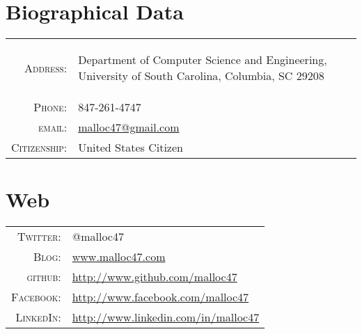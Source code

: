 \documentclass[a4paper,10pt]{article}
\begin{document}
\pagestyle{empty}
\par{\bigskip\par}



\begin{multicols}{2}
\setlength{\parskip}{0pt}
  \section{Biographical Data}

\begin{tabular}{r p{5.2cm}}
  \textsc{Address:}	& \begin{footnotesize} Department of Computer Science and Engineering, University of South Carolina, Columbia, SC 29208 \end{footnotesize} \\
  \textsc{Phone:}       & 847-261-4747\\
  \textsc{email:}       & \href{mailto:malloc47@gmail.com}{malloc47@gmail.com} \\
  \textsc{Citizenship:} & United States Citizen \\
\end{tabular}

\vfill
\columnbreak

\section{Web}
\begin{tabular}{r p{5cm}}
  \textsc{Twitter:}     & @malloc47 \\
  \textsc{Blog:}	& \href{http://www.malloc47.com}{www.malloc47.com} \\
  \textsc{github:}      & \href{http://www.github.com/malloc47}{http://www.github.com/malloc47}\\
  \textsc{Facebook:}    & \href{http://www.facebook.com/malloc47}{http://www.facebook.com/malloc47} \\
  \textsc{LinkedIn:}       & \href{http://www.linkedin.com/in/malloc47}{http://www.linkedin.com/in/malloc47} \\
\end{tabular}

\end{multicols}
\end{document}
